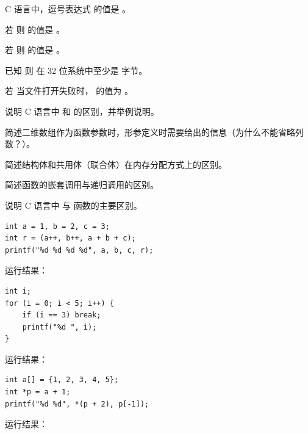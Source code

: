 \documentclass[a4paper,11pt]{article}
\begin{document}
\examtitle


\anslines{0.1cm}

\q C 语言中，逗号表达式  的值是 \fillblank 。

\q 若  则  的值是 \fillblank 。

\q 若  则  的值是 \fillblank 。

\q 已知  则  在 32 位系统中至少是 \fillblank 字节。

\q 若  当文件打开失败时， 的值为 \fillblank 。


\q 说明 C 语言中  和  的区别，并举例说明。
\anslines{1.5cm}

\q 简述二维数组作为函数参数时，形参定义时需要给出的信息（为什么不能省略列数？）。
\anslines{1.5cm}

\q 简述结构体和共用体（联合体）在内存分配方式上的区别。
\anslines{1.5cm}

\q 简述函数的嵌套调用与递归调用的区别。
\anslines{1.5cm}

\q 说明 C 语言中  与  函数的主要区别。
\anslines{1.5cm}


\q
\begin{lstlisting}[language={[custom]C}]
int a = 1, b = 2, c = 3;
int r = (a++, b++, a + b + c);
printf("%d %d %d %d", a, b, c, r);
\end{lstlisting}
运行结果：\underline{\hspace{3cm}}


\q
\begin{lstlisting}[language={[custom]C}]
int i;
for (i = 0; i < 5; i++) {
    if (i == 3) break;
    printf("%d ", i);
}
\end{lstlisting}
运行结果：\underline{\hspace{3cm}}


\q
\begin{lstlisting}[language={[custom]C}]
int a[] = {1, 2, 3, 4, 5};
int *p = a + 1;
printf("%d %d", *(p + 2), p[-1]);
\end{lstlisting}
运行结果：\underline{\hspace{3cm}}
\end{document}
